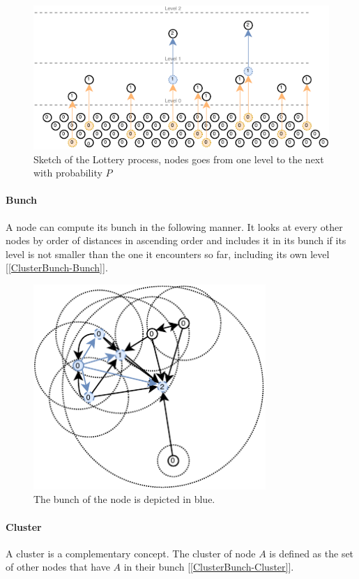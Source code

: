 \documentclass[a4paper,11pt,oneside]{report}
\begin{document}
\begin{figure}[!h] 
\centering
\includegraphics[width=400pt]{figures/Lottery-Standard}
\caption{Sketch of the Lottery process, nodes goes from one level to the next with probability $P$}
\label{fig:ClusterBunch-Bunch}
\end{figure}

\paragraph{Bunch} A node can compute its bunch in the following manner. It
looks at every other nodes by order of distances in ascending order and
includes it in its bunch if its level is not smaller than the one it encounters
so far, including its own level [\autoref{ClusterBunch-Bunch}]. 

\begin{figure}[!h] 
\centering
\includegraphics[width=250pt]{figures/ClusterBunch-Bunch}
\caption{ The bunch of the node is depicted in blue. }
\label{fig:ClusterBunch-Bunch}
\end{figure}

\paragraph{Cluster} A cluster is a complementary concept. The cluster of node
$A$ is defined as the set of other nodes that have $A$ in their bunch [\autoref{ClusterBunch-Cluster}]. 
\end{document}

